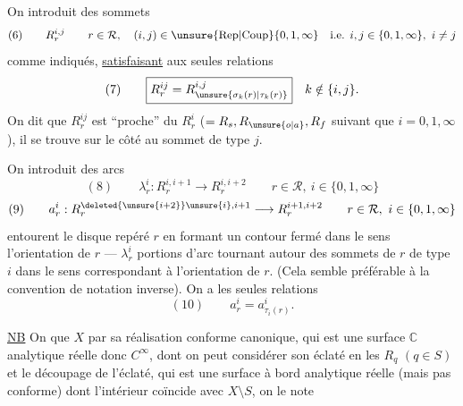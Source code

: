 
On introduit des sommets
\[
(6)\qquad R_r^{i,j}\qquad r\in\mathcal{R},\quad (i,j)\in\operatorname{\unsure{Rep|Coup}}\{0,1,\infty\}\quad\text{i.e. }i,j\in\{0,1,\infty\},\ i\ne j
\]
comme indiqués, \uline{satisfaisant} aux seules relations
\[
(7)\qquad \boxed{R_r^{ij}=R_{\unsure{\sigma_k(r)|\tau_k(r)}}^{i,j}}\quad k\notin\{i,j\}.
\]
On dit que $R_r^{ij}$ est ``proche'' du $R_r^i$  ($=R_s,R_{\unsure{o|a}},R_f$ suivant que $i=0,1,\infty$), il se trouve sur le côté    au sommet de type $j$.

On introduit des arcs
\[
(8)\qquad \lambda_r^i:R_r^{i,i+1}\longrightarrow R_r^{i,i+2}\qquad r\in\mathcal{R},\ i\in\{0,1,\infty\}
\]
\[
(9)\qquad a_r^i:R_r^{\deleted{\unsure{i+2}}\unsure{i},i+1}\longrightarrow R_r^{i+1,i+2}\qquad r\in\mathcal{R},\ i\in\{0,1,\infty\}
\]
  entourent le disque repéré $r$ en formant un contour fermé dans le sens   l'orientation de $r$ ---   $\lambda_r^i$   portions d'arc tournant autour des sommets de $r$ de type $i$ dans le sens correspondant à l'orientation de $r$. (Cela  semble préférable à la convention de notation inverse). On a les seules  relations
\[
(10)\qquad \boxed{a_r^i=a_{\tau_i(r)}^i}.
\]

\uline{NB} On  que $X$    par sa réalisation conforme canonique, qui est une surface $\mathbb{C}$ analytique réelle donc $C^\infty$, dont on peut considérer son éclaté en les $R_q$ $(q\in S)$ et le découpage de l'éclaté, qui est une surface à bord analytique réelle (mais pas conforme) dont l'intérieur coïncide avec $X\setminus S$, on le note


